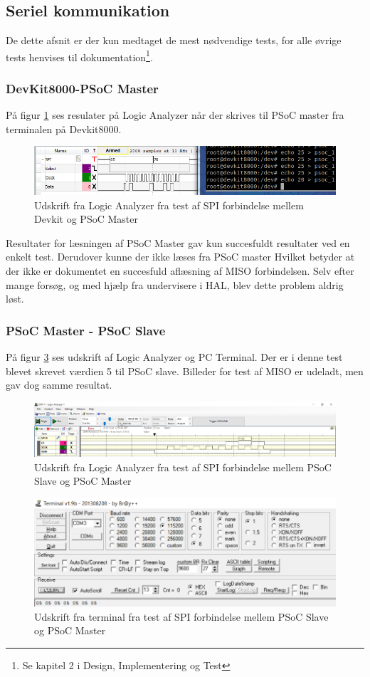 \subsection{Seriel kommunikation}
De dette afsnit er der kun medtaget de mest nødvendige tests, for alle øvrige tests henvises til dokumentation\footnote{Se kapitel 2 i Design, Implementering og Test}. 

\subsubsection{DevKit8000-PSoC Master}
På figur \ref{LA_SPI_1} ses resulater på Logic Analyzer når der skrives til PSoC master fra terminalen på Devkit8000.

\begin{figure}[H]
	\includegraphics[scale=0.6]{tex/TeImRe/SPI/Analog_devkit_echo_psoc_1}
	\caption{Udskrift fra Logic Analyzer fra test af SPI forbindelse mellem Devkit og PSoC Master}
	\label{LA_SPI_1}
\end{figure}

Resultater for læsningen af PSoC Master gav kun succesfuldt resultater ved en enkelt test. Derudover kunne der ikke læses fra PSoC master
Hvilket betyder at der ikke er dokumentet en succesfuld aflæsning af MISO forbindelsen. Selv efter mange forsøg, og med hjælp fra undervisere i HAL, blev 
dette problem aldrig løst.

\subsubsection{PSoC Master - PSoC Slave}
På figur \ref{LA_SPI_3} ses udskrift af Logic Analyzer og PC Terminal. Der er i denne test blevet skrevet værdien 5 til PSoC slave. Billeder for test af MISO er udeladt, men
gav dog samme resultat.

\begin{figure}[H]
	\includegraphics[scale=0.2]{tex/TeImRe/SPI/Logic_analyzer}
	\caption{Udskrift fra Logic Analyzer fra test af SPI forbindelse mellem PSoC Slave og PSoC Master}
	\label{LA_SPI_2}
\end{figure}

\begin{figure}[H]
	\includegraphics[scale=0.4]{tex/TeImRe/SPI/Terminal_spi_slave}
	\caption{Udskrift fra terminal fra test af SPI forbindelse mellem PSoC Slave og PSoC Master}
	\label{LA_SPI_3}
\end{figure}